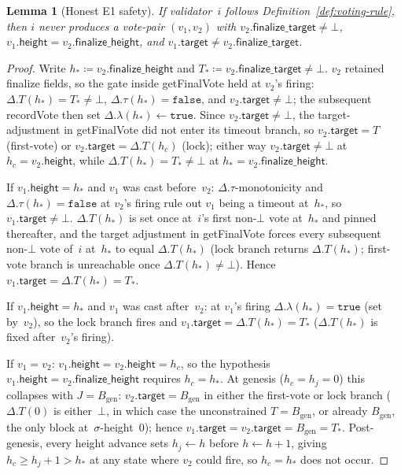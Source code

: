 \ifx\litemode\undefined\documentclass{article}\fi
\newcommand{\genesis}{\ensuremath{B_{\mathrm{gen}}}}
\newcommand{\target}{\mathsf{target}}
\newcommand{\height}{\mathsf{height}}
\newcommand{\finalizeHeight}{\mathsf{finalize\_height}}
\newcommand{\finalizeTarget}{\mathsf{finalize\_target}}
\newcommand{\getFinalVote}{\textsf{getFinalVote}\xspace}
\newcommand{\recordVote}{\textsf{recordVote}\xspace}
\theoremstyle{plain}
\newtheorem{lemma}{Lemma}
\theoremstyle{definition}
\theoremstyle{remark}
\begin{document}
\begin{lemma}[Honest E1 safety]\label{lem:honest-e1-safety}
If validator~$i$ follows Definition~\ref{def:voting-rule}, then $i$ never produces a vote-pair $(v_1, v_2)$ with $v_2.\finalizeTarget \neq \bot$, $v_1.\height = v_2.\finalizeHeight$, and $v_1.\target \neq v_2.\finalizeTarget$.
\end{lemma}

\begin{proof}
Write $h_\ast \coloneqq v_2.\finalizeHeight$ and $T_\ast \coloneqq v_2.\finalizeTarget \neq \bot$.
$v_2$ retained finalize fields, so the gate inside \getFinalVote held at $v_2$'s firing: $\Delta.T(h_\ast) = T_\ast \neq \bot$, $\Delta.\tau(h_\ast) = \mathtt{false}$, and $v_2.\target \neq \bot$; the subsequent \recordVote then set $\Delta.\lambda(h_\ast) \gets \mathtt{true}$.
Since $v_2.\target \neq \bot$, the target-adjustment in \getFinalVote did not enter its timeout branch, so $v_2.\target = T$ (first-vote) or $v_2.\target = \Delta.T(h_c)$ (lock); either way $v_2.\target \neq \bot$ at $h_c = v_2.\height$, while $\Delta.T(h_\ast) = T_\ast \neq \bot$ at $h_\ast = v_2.\finalizeHeight$.

If $v_1.\height = h_\ast$ and $v_1$ was cast before~$v_2$: $\Delta.\tau$-monotonicity and $\Delta.\tau(h_\ast) = \mathtt{false}$ at $v_2$'s firing rule out $v_1$ being a timeout at~$h_\ast$, so $v_1.\target \neq \bot$.
$\Delta.T(h_\ast)$ is set once at~$i$'s first non-$\bot$ vote at~$h_\ast$ and pinned thereafter, and the target adjustment in \getFinalVote forces every subsequent non-$\bot$ vote of~$i$ at~$h_\ast$ to equal $\Delta.T(h_\ast)$ (lock branch returns $\Delta.T(h_\ast)$; first-vote branch is unreachable once $\Delta.T(h_\ast) \neq \bot$).
Hence $v_1.\target = \Delta.T(h_\ast) = T_\ast$.

If $v_1.\height = h_\ast$ and $v_1$ was cast after~$v_2$: at $v_1$'s firing $\Delta.\lambda(h_\ast) = \mathtt{true}$ (set by~$v_2$), so the lock branch fires and $v_1.\target = \Delta.T(h_\ast) = T_\ast$ ($\Delta.T(h_\ast)$ is fixed after~$v_2$'s firing).

If $v_1 = v_2$: $v_1.\height = v_2.\height = h_c$, so the hypothesis $v_1.\height = v_2.\finalizeHeight$ requires $h_c = h_\ast$.
At genesis ($h_c = h_j = 0$) this collapses with $J = \genesis$: $v_2.\target = \genesis$ in either the first-vote or lock branch ($\Delta.T(0)$ is either~$\bot$, in which case the unconstrained $T = \genesis$, or already $\genesis$, the only block at~$\sigma$-height~$0$); hence $v_1.\target = v_2.\target = \genesis = T_\ast$.
Post-genesis, every height advance sets $h_j \gets h$ before $h \gets h+1$, giving $h_c \geq h_j + 1 > h_\ast$ at any state where $v_2$ could fire, so $h_c = h_\ast$ does not occur.
\end{proof}
\end{document}
